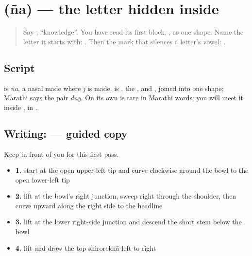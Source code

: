\section[\texorpdfstring{\mr{ञ} (ña)}{ञ (ña)}]{ (ña) — the letter hidden inside }

\label{lesson:MR-W281-letter-nya}



\begin{quote}
Say \textbf{}, \textquotedblleft{}knowledge\textquotedblright{}. You have read its first block, \textbf{}, as one shape. Name the letter it starts with: \textbf{}. Then the mark that silences a letter's vowel: \textbf{}.
\end{quote}

\subsection*{Script}
\begin{quote}
\end{quote}

\textbf{} is \emph{ña}, a nasal made where \emph{j} is made. \textbf{} is \textbf{}, the \textbf{}, and \textbf{}, joined into one shape; Marathi says the pair \emph{dny}. On its own \textbf{} is rare in Marathi words; you will meet it inside \textbf{}, in \textbf{}.

\subsection*{Writing:  — guided copy}

Keep \textbf{} in front of you for this first pass.

\begin{itemize}
\raggedright
  \item \textbf{1.} start at the open upper-left tip and curve clockwise around the bowl to the open lower-left tip
  \item \textbf{2.} lift at the bowl's right junction, sweep right through the shoulder, then curve upward along the right side to the headline
  \item \textbf{3.} lift at the lower right-side junction and descend the short stem below the bowl
  \item \textbf{4.} lift and draw the top shirorekhā left-to-right
\end{itemize}

